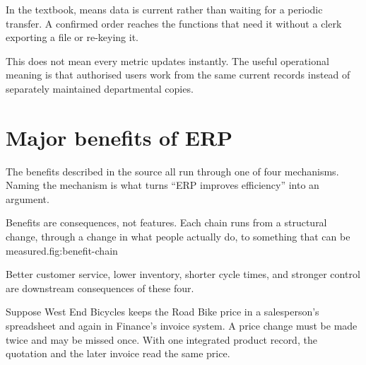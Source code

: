In the textbook,  means data is current rather than waiting for a
periodic transfer. A confirmed order reaches the functions that need it without
a clerk exporting a file or re-keying it.

This does not mean every metric updates instantly. The useful operational
meaning is that authorised users work from the same current records instead of
separately maintained departmental copies.

\section{Major benefits of ERP}

The benefits described in the source all run through one of four mechanisms.
Naming the mechanism is what turns ``ERP improves efficiency'' into an argument.

\begin{utpfig}{Benefits are consequences, not features. Each
chain runs from a structural change, through a change in what people actually
do, to something that can be measured.}{fig:benefit-chain}
\end{utpfig}

Better customer service, lower inventory, shorter cycle times, and stronger
control are downstream consequences of these four.

\begin{workedexample}
Suppose West End Bicycles keeps the Road Bike price in a salesperson's
spreadsheet and again in Finance's invoice system. A price change must be made
twice and may be missed once. With one integrated product record, the quotation
and the later invoice read the same price.
\end{workedexample}

